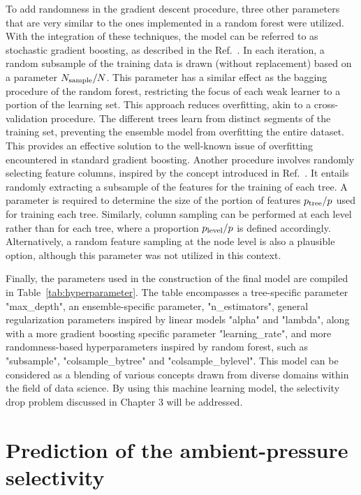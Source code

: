 \documentclass[main]{subfiles}
\begin{document}
To add randomness in the gradient descent procedure, three other parameters that are very similar to the ones implemented in a random forest were utilized. With the integration of these techniques, the model can be referred to as stochastic gradient boosting, as described in the Ref.~\cite{Friedman2002}. In each iteration, a random subsample of the training data is drawn (without replacement) based on a parameter $N_{\text{sample}}/N$. This parameter has a similar effect as the bagging procedure of the random forest, restricting the focus of each weak learner to a portion of the learning set. This approach reduces overfitting, akin to a cross-validation procedure. The different trees learn from distinct segments of the training set, preventing the ensemble model from overfitting the entire dataset. This provides an effective solution to the well-known issue of overfitting encountered in standard gradient boosting. Another procedure involves randomly selecting feature columns, inspired by the concept introduced in Ref.~\cite{Tin_Kam_Ho_1998}. It entails randomly extracting a subsample of the features for the training of each tree. A parameter is required to determine the size of the portion of features  $p_{\text{tree}}/p$ used for training each tree. Similarly, column sampling can be performed at each level rather than for each tree, where a proportion $p_{\text{level}}/p$ is defined accordingly. Alternatively, a random feature sampling at the node level is also a plausible option, although this parameter was not utilized in this context.

Finally, the parameters used in the construction of the final model are compiled in Table~\ref{tab:hyperparameter}. The table encompasses a tree-specific parameter "max\_depth", an ensemble-specific parameter, "n\_estimators", general regularization parameters inspired by linear models "alpha" and "lambda", along with a more gradient boosting specific parameter "learning\_rate", and more randomness-based hyperparameters inspired by random forest, such as "subsample", "colsample\_bytree" and "colsample\_bylevel". This model can be considered as a blending of various concepts drawn from diverse domains within the field of data science. By using this machine learning model, the selectivity drop problem discussed in Chapter 3 will be addressed.

\section{Prediction of the ambient-pressure selectivity}
\end{document}
